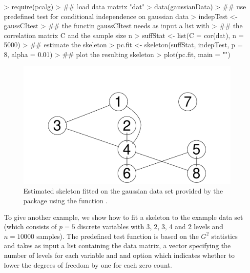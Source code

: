 \documentclass[article]{jss}
\begin{document}
\begin{Schunk}
\begin{Sinput}
> require(pcalg)
> ## load data matrix "dat"
> data(gaussianData)
> ## use predefined test for conditional independence on gaussian data
> indepTest <- gaussCItest 
> ## the functin gaussCItest needs as input a list with
> ## the correlation matrix C and the sample size n
> suffStat <- list(C = cor(dat), n = 5000)
> ## estimate the skeleton
> pc.fit <- skeleton(suffStat, indepTest, p = 8, alpha = 0.01)
> ## plot the resulting skeleton
> plot(pc.fit, main = "")
\end{Sinput}
\end{Schunk}
\begin{figure}
  \begin{center}
\includegraphics{pcalgDoc-skelExpl1Plot}
\caption{Estimated skeleton fitted on the gaussian data set provided by the
  package using the function .}
\label{fig:skelExpl}
\end{center}
\end{figure}

To give another example, we show how to fit a skeleton to the example data
set  (which consists of $p=5$ discrete variables with 3,
2, 3, 4 and 2 levels and $n=10000$ samples). The predefined test function
 is based on the $G^2$ statistics and takes as input a list
containing the data matrix, a vector specifying the number of levels for
each variable and and option which indicates whether to lower the degrees
of freedom by one for each zero count.
\end{document}
